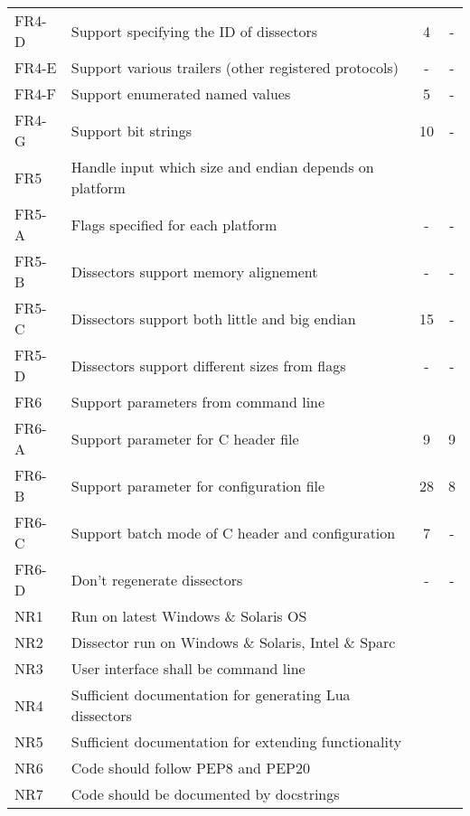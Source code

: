 \begin{table}[ht]
\begin{tabularx}{\textwidth}{l X c c}
	FR4-D & Support specifying the ID of dissectors & 4 & - \\
	FR4-E & Support various trailers (other registered protocols) & - & - \\
	FR4-F & Support enumerated named values  & 5 & - \\
	FR4-G & Support bit strings & 10 & - \\
	\addlinespace
	FR5 & Handle input which size and endian depends on platform & & \\
	FR5-A & Flags specified for each platform & - & - \\
	FR5-B & Dissectors support memory alignement & - & - \\
	FR5-C & Dissectors support both little and big endian & 15 & - \\
	FR5-D & Dissectors support different sizes from flags & - & - \\	
	\addlinespace
	FR6 & Support parameters from command line & & \\
	FR6-A & Support parameter for C header file & 9 & 9 \\
	FR6-B & Support parameter for configuration file & 28 & 8 \\
	FR6-C & Support batch mode of C header and configuration & 7 & - \\
	FR6-D & Don't regenerate dissectors & - & - \\
	\addlinespace
	NR1 & Run on latest Windows \& Solaris OS & & \\
	NR2 & Dissector run on Windows \& Solaris, Intel \& Sparc & & \\
	NR3 & User interface shall be command line & & \\
	NR4 & Sufficient documentation for generating Lua dissectors & & \\
	NR5 & Sufficient documentation for extending functionality & & \\
	NR6 & Code should follow PEP8 and PEP20 & & \\
	NR7 & Code should be documented by docstrings & & \\
	\bottomrule
\end{tabularx}
\end{table}

